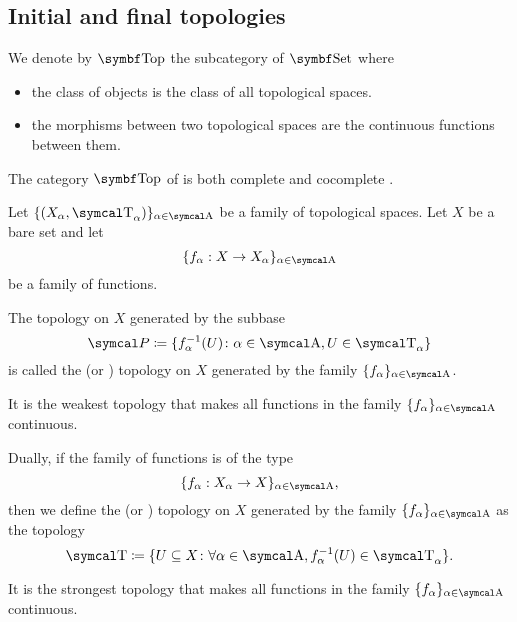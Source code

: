 \subsection{Initial and final topologies}\label{subsec:initial_final_topologies}

\begin{definition}\label{def:category_of_topological_spaces}
  We denote by \( \Cat{Top} \) the subcategory of \( \Cat{Set} \) where
  \begin{itemize}
    \item the class of objects is the class of all topological spaces.
    \item the morphisms between two topological spaces are the continuous functions between them.
  \end{itemize}
\end{definition}

\begin{theorem}\label{thm:top_complete_cocomplete}
  The category \( \Cat{Top} \) of is both complete  and cocomplete .
\end{theorem}

\begin{definition}\label{def:initial_topology}\cite{nLab:top}
  Let \( \{ (X_\al, \CT_\al) \}_{\al \in \CA} \) be a family of topological spaces. Let \( X \) be a bare set and let
  \begin{equation*}
    \{ f_\al: X \to X_\al \}_{\al \in \CA}
  \end{equation*}
  be a family of functions.

  The topology on \( X \) generated by the subbase
  \begin{equation*}
    \Cal{P} \coloneqq \{ f_\al^{-1}(U) \colon \al \in \CA, U \in \CT_\al \}
  \end{equation*}
  is called the  (or ) topology on \( X \) generated by the family \( \{ f_\al \}_{\al \in \CA} \).

  It is the weakest topology that makes all functions in the family \( \{ f_\al \}_{\al \in \CA} \) continuous.
\end{definition}

\begin{definition}\label{def:final_topology}\cite{nLab:top}
  Dually, if the family of functions is of the type
  \begin{equation*}
    \{ f_\al: X_\al \to X \}_{\al \in \CA},
  \end{equation*}
  then we define the  (or ) topology on \( X \) generated by the family \( \{ f_\al \}_{\al \in \CA} \) as the topology
  \begin{equation*}
    \CT \coloneqq \{ U \subseteq X \colon \forall \al \in \CA, f_\al^{-1}(U) \in \CT_\al \}.
  \end{equation*}

  It is the strongest topology that makes all functions in the family \( \{ f_\al \}_{\al \in \CA} \) continuous.
\end{definition}

